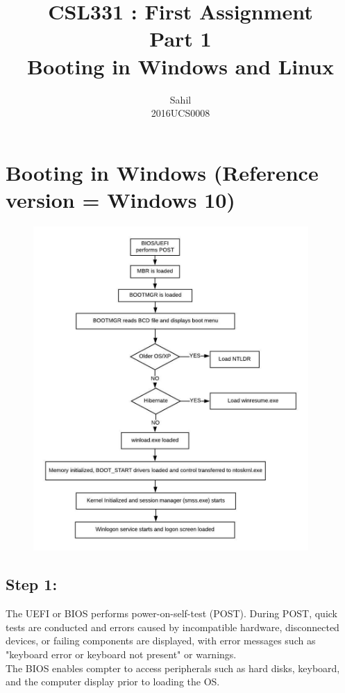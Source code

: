 \documentclass[]{report}
\title{\centering CSL331 : First Assignment \\Part 1\\Booting in Windows and Linux}
\author{\LARGE Sahil\\2016UCS0008}
\begin{document}
\maketitle


\section{Booting in Windows (Reference version = Windows 10)}

\begin{figure}[H]
	\vspace{0pt}
	\includegraphics[height = 350pt, keepaspectratio]{windows_booting.jpeg}
\end{figure}


\large
\subsection{Step 1:} 
The UEFI or BIOS performs power-on-self-test (POST). During POST, quick tests are conducted and errors caused by incompatible hardware, disconnected devices, or failing components are displayed, with error messages such as "keyboard error or keyboard not present" or warnings. \\
The BIOS enables compter to access peripherals such as hard disks, keyboard, and the computer display prior to loading the OS.
\end{document}
